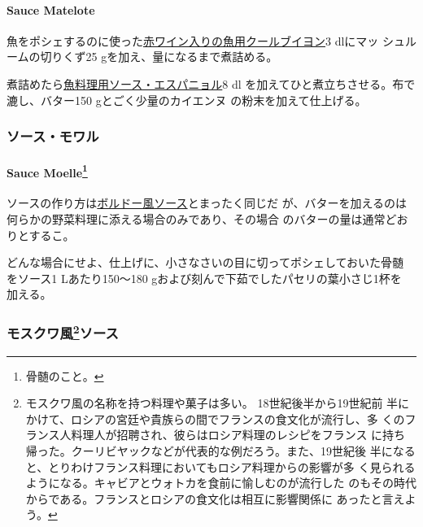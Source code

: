 \hypertarget{sauce-matelote}{%
\paragraph{Sauce Matelote}\label{sauce-matelote}}

   

魚をポシェするのに使った\href{}{赤ワイン入りの魚用クールブイヨン}3
dlにマッ シュルームの切りくず25
gを加え、\untiers{}量になるまで煮詰める。

煮詰めたら\protect\hyperlink{sauce-espagnole-maigre}{魚料理用ソース・エスパニョル}8
dl を加えてひと煮立ちさせる。布で漉し、バター150 gとごく少量のカイエンヌ
の粉末を加えて仕上げる。

\maeaki

\hypertarget{ux30bdux30fcux30b9ux30e2ux30efux30eb}{%
\subsubsection{ソース・モワル}\label{ux30bdux30fcux30b9ux30e2ux30efux30eb}}

\hypertarget{sauce-moelle}{%
\paragraph[Sauce Moelle]{\texorpdfstring{Sauce Moelle\footnote{骨髄のこと。}}{Sauce Moelle}}\label{sauce-moelle}}

  

ソースの作り方は\protect\hyperlink{sauce-bordelaise}{ボルドー風ソース}とまったく同じだ
が、バターを加えるのは何らかの野菜料理に添える場合のみであり、その場合
のバターの量は通常どおりとするこ。

どんな場合にせよ、仕上げに、小さなさいの目に切ってポシェしておいた骨髄
をソース1 Lあたり150〜180 gおよび刻んで下茹でしたパセリの葉小さじ1杯を
加える。

\maeaki

\hypertarget{ux30e2ux30b9ux30afux30efux98a856ux30bdux30fcux30b9}{%
\subsubsection[モスクワ風ソース]{\texorpdfstring{モスクワ風\footnote{モスクワ風の名称を持つ料理や菓子は多い。
  18世紀後半から19世紀前
  半にかけて、ロシアの宮廷や貴族らの間でフランスの食文化が流行し、多
  くのフランス人料理人が招聘され、彼らはロシア料理のレシピをフランス
  に持ち帰った。クーリビヤックなどが代表的な例だろう。また、19世紀後
  半になると、とりわけフランス料理においてもロシア料理からの影響が多
  く見られるようになる。キャビアとウォトカを食前に愉しむのが流行した
  のもその時代からである。フランスとロシアの食文化は相互に影響関係に
  あったと言えよう。}ソース}{モスクワ風ソース}}\label{ux30e2ux30b9ux30afux30efux98a856ux30bdux30fcux30b9}}

